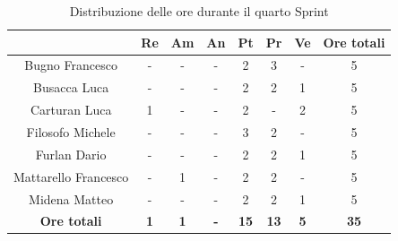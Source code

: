\begin{table}[H]
  \centering
  \renewcommand{\arraystretch}{1.8}
  \begin{tabular}{c|c|c|c|c|c|c|c}
    \rowcolor[HTML]{125E28}
    \multicolumn{1}{c}{\color[HTML]{FFFFFF}\textbf{ Nominativo }}
                         & \multicolumn{1}{c}{\color[HTML]{FFFFFF}\textbf{ Re }}
                         & \multicolumn{1}{c}{\color[HTML]{FFFFFF}\textbf{ Am}}
                         & \multicolumn{1}{c}{\color[HTML]{FFFFFF}\textbf{ An }}
                         & \multicolumn{1}{c}{\color[HTML]{FFFFFF}\textbf{ Pt }}
                         & \multicolumn{1}{c}{\color[HTML]{FFFFFF}\textbf{ Pr }}
                         & \multicolumn{1}{c}{\color[HTML]{FFFFFF}\textbf{ Ve }}
                         & \multicolumn{1}{c}{\color[HTML]{FFFFFF}\textbf{ Ore totali }}                                                                                  \\
    \hline
    Bugno Francesco      & -                                                             & -          & -          & 2           & 3           & -          & 5           \\
    Busacca Luca         & -                                                             & -          & -          & 2           & 2           & 1          & 5           \\
    Carturan Luca        & 1                                                             & -          & -          & 2           & -           & 2          & 5           \\
    Filosofo Michele     & -                                                             & -          & -          & 3           & 2           & -          & 5           \\
    Furlan Dario         & -                                                             & -          & -          & 2           & 2           & 1          & 5           \\
    Mattarello Francesco & -                                                             & 1          & -          & 2           & 2           & -          & 5           \\
    Midena Matteo        & -                                                             & -          & -          & 2           & 2           & 1          & 5           \\
    \textbf{Ore totali}  & \textbf{1}                                                    & \textbf{1} & \textbf{-} & \textbf{15} & \textbf{13} & \textbf{5} & \textbf{35}
  \end{tabular}
  \caption{Distribuzione delle ore durante il quarto Sprint}
\end{table}

